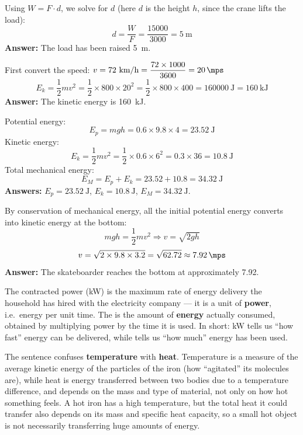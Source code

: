 \documentclass[11pt,a4paper]{article}
\begin{document}
\begin{solucioneng}
Using $W = F \cdot d$, we solve for $d$ (here $d$ is the height $h$, since the crane lifts the load):
\[
d = \frac{W}{F} = \frac{15000}{3000} = \qty{5}{\metre}
\]
\textbf{Answer:} The load has been raised \qty{5}{\metre}.
\end{solucioneng}

\begin{solucioneng}
First convert the speed: $v = 72 \text{ km/h} = \dfrac{72 \times 1000}{3600} = \qty{20}{\mps}$
\[
E_k = \frac{1}{2}mv^2 = \frac{1}{2} \times 800 \times 20^2 = \frac{1}{2} \times 800 \times 400 = \qty{160000}{\joule} = \qty{160}{\kilo\joule}
\]
\textbf{Answer:} The kinetic energy is \qty{160}{\kilo\joule}.
\end{solucioneng}

\begin{solucioneng}
Potential energy:
\[
E_p = mgh = 0.6 \times 9.8 \times 4 = \qty{23.52}{\joule}
\]
Kinetic energy:
\[
E_k = \frac{1}{2}mv^2 = \frac{1}{2} \times 0.6 \times 6^2 = 0.3 \times 36 = \qty{10.8}{\joule}
\]
Total mechanical energy:
\[
E_M = E_p + E_k = 23.52 + 10.8 = \qty{34.32}{\joule}
\]
\textbf{Answers:} $E_p = \qty{23.52}{\joule}$, $E_k = \qty{10.8}{\joule}$, $E_M = \qty{34.32}{\joule}$.
\end{solucioneng}

\begin{solucioneng}
By conservation of mechanical energy, all the initial potential energy converts into kinetic energy at the bottom:
\[
mgh = \frac{1}{2}mv^2 \Rightarrow v = \sqrt{2gh}
\]
\[
v = \sqrt{2 \times 9.8 \times 3.2} = \sqrt{62.72} \approx \qty{7.92}{\mps}
\]
\textbf{Answer:} The skateboarder reaches the bottom at approximately \qty{7.92}{\mps}.
\end{solucioneng}

\begin{solucioneng}
The contracted power (\unit{\kilo\watt}) is the maximum rate of energy delivery the household has hired with the electricity company --- it is a unit of \textbf{power}, i.e.\ energy per unit time. The \unit{\kwh} is the amount of \textbf{energy} actually consumed, obtained by multiplying power by the time it is used. In short: \unit{\kilo\watt} tells us ``how fast'' energy can be delivered, while \unit{\kwh} tells us ``how much'' energy has been used.
\end{solucioneng}

\begin{solucioneng}
The sentence confuses \textbf{temperature} with \textbf{heat}. Temperature is a measure of the average kinetic energy of the particles of the iron (how ``agitated'' its molecules are), while heat is energy transferred between two bodies due to a temperature difference, and depends on the mass and type of material, not only on how hot something feels. A hot iron has a high temperature, but the total heat it could transfer also depends on its mass and specific heat capacity, so a small hot object is not necessarily transferring huge amounts of energy.
\end{solucioneng}
\end{document}
